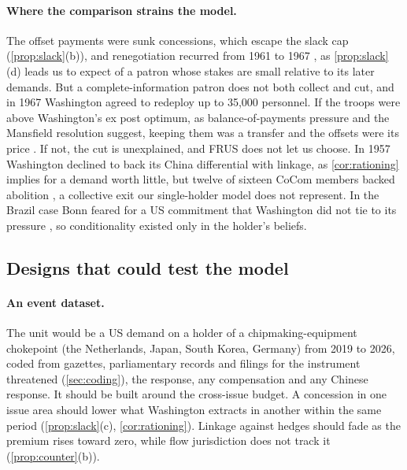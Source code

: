 \paragraph{Where the comparison strains the model.} The offset payments were sunk concessions, which escape the slack cap (\cref{prop:slack}(b)), and renegotiation recurred from 1961 to 1967 \citep{frus1995foreignecon, frus1999germany, frus1995westerneurope}, as \cref{prop:slack}(d) leads us to expect of a patron whose stakes are small relative to its later demands. But a complete-information patron does not both collect and cut, and in 1967 Washington agreed to redeploy up to 35,000 personnel. If the troops were above Washington's ex post optimum, as balance-of-payments pressure and the Mansfield resolution suggest, keeping them was a transfer and the offsets were its price \citep{gavin2004gold, zimmermann2002money}. If not, the cut is unexplained, and FRUS does not let us choose. In 1957 Washington declined to back its China differential with linkage, as \cref{cor:rationing} implies for a demand worth little, but twelve of sixteen CoCom members backed abolition \citep{frus1989economicdefense, mastanduno1992economic}, a collective exit our single-holder model does not represent. In the Brazil case Bonn feared for a US commitment that Washington did not tie to its pressure \citep{frus2014westerneurope}, so conditionality existed only in the holder's beliefs.

\subsection{Designs that could test the model}\label{sec:tests}

\paragraph{An event dataset.} The unit would be a US demand on a holder of a chipmaking-equipment chokepoint (the Netherlands, Japan, South Korea, Germany) from 2019 to 2026, coded from gazettes, parliamentary records and filings for the instrument threatened (\cref{sec:coding}), the response, any compensation and any Chinese response. It should be built around the cross-issue budget. A concession in one issue area should lower what Washington extracts in another within the same period (\cref{prop:slack}(c), \cref{cor:rationing}). Linkage against hedges should fade as the premium rises toward zero, while flow jurisdiction does not track it (\cref{prop:counter}(b)).


